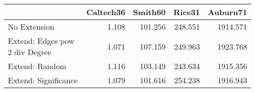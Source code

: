 \begin{tabular}{lrrrr}
\toprule
{} & Caltech36 & Smith60 &  Rice31 & Auburn71 \\
\midrule
No Extension                   &     1.108 & 101.256 & 248.551 & 1914.571 \\
Extend: Edges pow 2 div Degree &     1.071 & 107.159 & 249.963 & 1923.768 \\
Extend: Random                 &     1.116 & 103.149 & 243.634 & 1915.356 \\
Extend: Significance           &     1.079 & 101.616 & 254.238 & 1916.943 \\
\bottomrule
\end{tabular}
